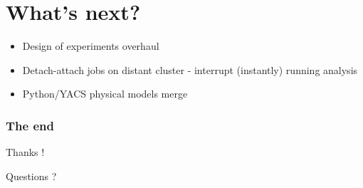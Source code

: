 \documentclass[aspectratio=169]{beamer}
\begin{document}

\section{What's next?}
\begin{frame}
  \begin{itemize}
  \item Design of experiments overhaul
  \item Detach-attach jobs on distant cluster - interrupt (instantly) running analysis
  \item Python/YACS physical models merge
  \end{itemize}
\end{frame}

\begin{frame}
\frametitle{The end}
\begin{center}
Thanks !
\end{center}

\begin{center}
Questions ?
\end{center}

\end{frame}


\end{document}
